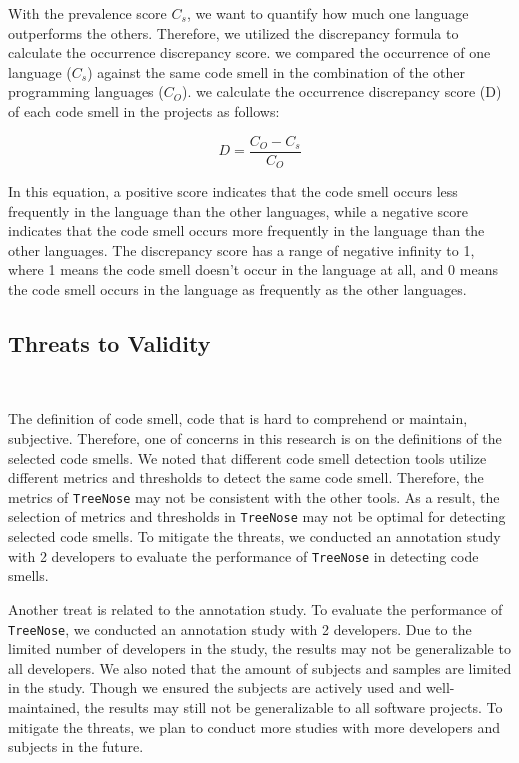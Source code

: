 With the prevalence score $C_{s}$, we want to quantify how much one language
outperforms the others. Therefore, we utilized the discrepancy formula to
calculate the occurrence discrepancy score. we compared the occurrence of one
language ($C_{s}$) against the same code smell in the combination of the other
programming languages ($C_{O}$). we calculate the occurrence discrepancy score
(D) of each code smell in the projects as follows:

\vspace{-1.0em}

\begin{equation}
    D = \frac{C_{O} - C_{s}}{C_{O}}
\end{equation}

In this equation, a positive score indicates that the code smell occurs less
frequently in the language than the other languages, while a negative score
indicates that the code smell occurs more frequently in the language than the
other languages. The discrepancy score has a range of negative infinity to 1,
where 1 means the code smell doesn't occur in the language at all, and 0 means
the code smell occurs in the language as frequently as the other languages.



\subsection{Threats to Validity}~\label{sec:threats-to-validity}

The definition of code smell, code that is hard to comprehend or maintain,
subjective. Therefore, one of concerns in this research is on the definitions
of the selected code smells. We noted that different code smell detection tools
utilize different metrics and thresholds to detect the same code smell.
Therefore, the metrics of \texttt{TreeNose} may not be consistent with the
other tools. As a result, the selection of metrics and thresholds in
\texttt{TreeNose} may not be optimal for detecting selected code smells. To
mitigate the threats, we conducted an annotation study with 2 developers to
evaluate the performance of \texttt{TreeNose} in detecting code smells.

Another treat is related to the annotation study. To evaluate the performance
of \texttt{TreeNose}, we conducted an annotation study with 2 developers. Due
to the limited number of developers in the study, the results may not be
generalizable to all developers. We also noted that the amount of subjects and
samples are limited in the study. Though we ensured the subjects are actively
used and well-maintained, the results may still not be generalizable to all
software projects. To mitigate the threats, we plan to conduct more studies
with more developers and subjects in the future.

